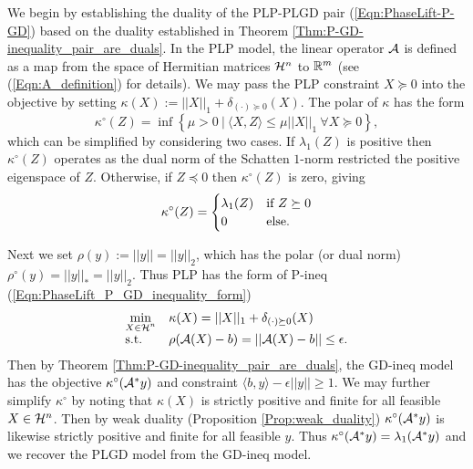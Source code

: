 We begin by establishing the duality of the PLP-PLGD pair (\ref{Eqn:PhaseLift-P-GD}) based on the duality established in Theorem \ref{Thm:P-GD-inequality_pair_are_duals}.  In the PLP model, the linear operator ${\mathcal A}$ is defined as a map from the space of Hermitian matrices ${\mathcal H}^n$ to ${\mathbb R}^m$ (see (\ref{Eqn:A_definition}) for details).  We may pass the PLP constraint $X \succeq 0$ into the objective by setting $\kappa(X) := ||X||_1 + \delta_{(\cdot) \succeq 0}(X)$.  The polar of $\kappa$ has the form  
\[
\kappa^\circ(Z) = \inf \left\{ \mu > 0 \ | \ \langle X, Z \rangle \leq \mu ||X||_1 \ \forall X \succeq 0 \right\},
\]
which can be simplified by considering two cases. If $\lambda_1(Z)$ is positive then $\kappa^\circ(Z)$ operates as the dual norm of the Schatten $1$-norm restricted the positive eigenspace of $Z$.  Otherwise, if $Z \preceq 0$ then $\kappa^\circ(Z)$ is zero, giving
\begin{equation}			\label{Eqn:kappa_polar}
\kappa^\circ(Z) = 
	\begin{cases}
		\lambda_1(Z)	&	\textnormal{if } Z \succeq 0	\\
		0	&	\textnormal{else}.
	\end{cases}
\end{equation}

Next we set $\rho(y) := ||y||= ||y||_2$, which has the polar (or dual norm) $\rho^\circ(y) = ||y||_* = ||y||_2$.  Thus PLP has the form of P-ineq (\ref{Eqn:PhaseLift_P_GD_inequality_form})
\begin{equation*} 			
\begin{array}{ll}
		\min\limits_{\substack{X \in {\mathcal H}^n}}
		&	\kappa(X) = ||X||_1 + \delta_{(\cdot) \succeq 0}(X)
						\\

		\textnormal{s.t.}
		& 	\rho({\mathcal A}(X)-b) = ||{\mathcal A}(X) - b|| \leq \epsilon.
\end{array}
\end{equation*}
Then by Theorem \ref{Thm:P-GD-inequality_pair_are_duals}, the GD-ineq model has the objective $\kappa^\circ({\mathcal A}^*y)$ and constraint $\langle b, y \rangle - \epsilon ||y|| \geq 1$.  We may further simplify $\kappa^\circ$ by noting that $\kappa(X)$ is strictly positive and finite for all feasible $X \in {\mathcal H}^n$.  Then by weak duality (Proposition \ref{Prop:weak_duality}) $\kappa^\circ({\mathcal A}^*y)$ is likewise strictly positive and finite for all feasible $y$.  Thus $\kappa^\circ({\mathcal A}^*y) = \lambda_1({\mathcal A}^*y)$ and we recover the PLGD model from the GD-ineq model.






